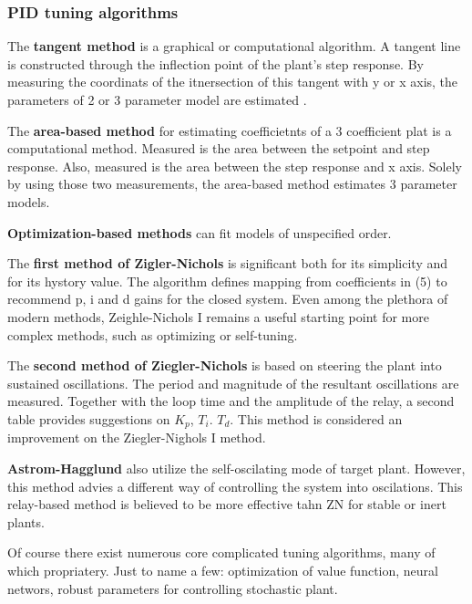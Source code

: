 \subsubsection{PID tuning algorithms}
The \textbf{tangent method} is a graphical or computational algorithm.
A tangent line is constructed through the inflection point of the plant's step response.
By measuring the coordinats of the itnersection of this tangent with y or x axis,
the parameters of 2 or 3 parameter model are estimated \cite[p. 55]{garipov}.
\par
The \textbf{area-based method} for estimating coefficietnts of a 3 coefficient plat is a computational method.
Measured is the area between the setpoint and step response.
Also, measured is the area between the step response and x axis.
Solely by using those two measurements, the area-based method estimates 3 parameter models.
\par
\textbf{Optimization-based methods} can fit models of unspecified order.
\par
The \textbf{first method of Zigler-Nichols} is significant both for its simplicity and for its hystory value.
The algorithm defines mapping from coefficients in (5) to recommend p, i and d gains for the closed system.
Even among the plethora of modern methods, Zeighle-Nichols I remains a useful starting point for more complex methods, such as optimizing or self-tuning.
\par
The \textbf{second method of Ziegler-Nichols} is based on steering the plant into sustained oscillations.
The period and magnitude of the resultant oscillations are measured.
Together with the loop time and the amplitude of the relay, a second table provides suggestions on $K_p$, $T_i$. $T_d$.
This method is considered an improvement on the Ziegler-Nighols I method.
\par
\textbf{Astrom-Hagglund} also utilize the self-oscilating mode of target plant.
However, this method advies a different way of controlling the system into oscilations.
This relay-based method is believed to be more effective tahn ZN for stable or inert plants.
\par
Of course there exist numerous core complicated tuning algorithms, many of which propriatery.
Just to name a few: optimization of value function, neural networs, robust parameters for controlling stochastic plant.

